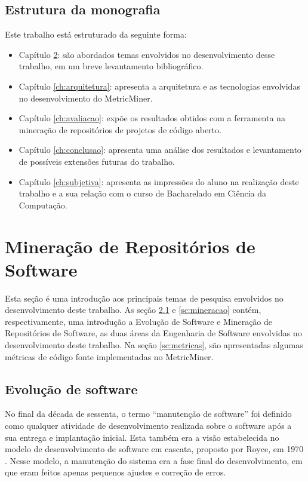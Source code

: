 \documentclass[a4paper, 12pt, twoside]{book}
\begin{document}
    \section{Estrutura da monografia}
        Este trabalho está estruturado da seguinte forma: 
        \begin{itemize}
            \item Capítulo \ref{ch:conceitos}: são abordados temas 
                envolvidos no desenvolvimento desse trabalho, em um breve levantamento bibliográfico.
            \item Capítulo \ref{ch:arquitetura}: apresenta a arquitetura e as tecnologias
            envolvidas no desenvolvimento do MetricMiner.
            \item Capítulo \ref{ch:avaliacao}: expõe os resultados obtidos com a ferramenta 
                na mineração de repositórios de projetos de código aberto.
            \item Capítulo \ref{ch:conclusao}: apresenta uma análise dos resultados e levantamento 
                de possíveis extensões futuras do trabalho.
            \item Capítulo \ref{ch:subjetiva}: apresenta as impressões do aluno na realização 
                deste trabalho e a sua relação com o curso de Bacharelado em Ciência da Computação.
        \end{itemize}
    
\chapter{Mineração de Repositórios de Software} \label{ch:conceitos}
    Esta seção é uma introdução aos principais temas de pesquisa envolvidos no desenvolvimento
    deste trabalho. As seção \ref{sc:evolucao} e \ref{sc:mineracao} contém, respectivamente, 
    uma introdução a Evolução de Software e Mineração de Repositórios de Software, as duas áreas 
    da Engenharia de Software envolvidas no desenvolvimento deste trabalho. Na seção 
    \ref{sc:metricas}, são apresentadas algumas métricas de código fonte implementadas no 
    MetricMiner. 

    \section{Evolução de software} \label{sc:evolucao}
        No final da década de sessenta, o termo ``manutenção de software'' foi definido 
        como qualquer atividade de desenvolvimento realizada sobre o software após a sua
        entrega e implantação inicial. Esta também era a visão estabelecida no modelo de
        desenvolvimento de software em cascata, proposto por Royce, em 1970 
        \cite{DBLP:series/springer/Mens08}. Nesse modelo, a manutenção do sistema era a fase final do 
        desenvolvimento, em que eram feitos apenas pequenos ajustes e correção de erros.
        
\end{document}
